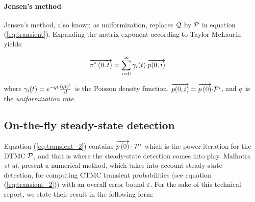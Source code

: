 \documentclass[a4paper,11pt]{article}
\newcommand{\SubSection}[1]{\subsection{#1}}
\begin{document}
	\paragraph{Jensen's method}
		 Jensen's method, also known as uniformization, replaces $\mathcal{Q}$ by $\mathcal{P}$ in equation (\ref{eq:transient}).  Expanding the matrix exponent according to Taylor-McLaurin yields:

		\begin{equation}
			\overrightarrow{\pi^{*} \left(0, t \right )} = \sum_{i=0}^{\infty}\gamma_{i}(t) {\cdot} \overrightarrow{p(0,i)}
			\label{eq:transient_2}
		\end{equation}

		where $\gamma_{i}(t) = e^{-q t}\frac{\left( q t \right)^{i}}{i!}$ is the Poisson density function, $\overrightarrow{p(0,i)} = \overrightarrow{p \left( 0 \right)} {\cdot} \mathcal{P}^{i}$, and $q$ is the \emph{uniformization rate}.

	\SubSection{On-the-fly steady-state detection \label{ss:ofssd_trans}}
		Equation (\ref{eq:transient_2}) contains $\overrightarrow{p \left( 0 \right)} \cdot \mathcal{P}^{i}$ which is the power iteration for the DTMC $\mathcal{P}$, and that is where the steady-state detection comes into play.  Malhotra \emph{et al.} \cite{MalhotraMT_MR94} present a numerical method, which takes into account steady-state detection, for computing CTMC transient probabilities (see equation (\ref{eq:transient_2})) with an overall error bound $\varepsilon$.  For the sake of this technical report, we state their result in the following form:
\end{document}
